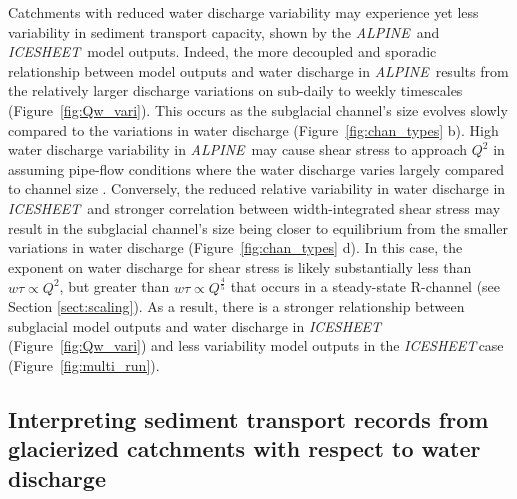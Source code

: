 \documentclass[esurf, manuscript]{copernicus}
\newcommand{\alpine}{\textit{ALPINE}\,}
\newcommand{\icesheet}{\textit{ICESHEET}\,}
\begin{document}
Catchments with reduced water discharge variability may experience yet less variability in sediment transport capacity, shown by the \alpine{} and \icesheet{} model outputs.
Indeed, the more decoupled and sporadic relationship between model outputs and water discharge in \alpine{} results from the relatively larger discharge variations on sub-daily to weekly timescales (Figure~\ref{fig:Qw_vari}).
This occurs as the subglacial channel's size evolves slowly compared to the variations in water discharge (Figure~\ref{fig:chan_types} b).
High water discharge variability in \alpine{} may cause shear stress to approach $Q^{2}$ in assuming pipe-flow conditions where the water discharge varies largely compared to channel size \citep[Figure~\ref{fig:chan_types}; Section \ref{sect:scaling}; c.f.][]{alley1997}.
Conversely, the reduced relative variability in water discharge in \icesheet{} and stronger correlation between width-integrated shear stress may result in the subglacial channel's size being closer to equilibrium from the smaller variations in water discharge (Figure~\ref{fig:chan_types} d).
In this case, the exponent on water discharge for shear stress is likely substantially less than $w\tau \propto Q^2$, but greater than $w \tau \propto Q^{\frac{4}{5}}$ that occurs in a steady-state R-channel (see Section \ref{sect:scaling}).
As a result, there is a stronger relationship between subglacial model outputs and water discharge in \icesheet{} (Figure~\ref{fig:Qw_vari}) and less variability model outputs in the \icesheet case (Figure~\ref{fig:multi_run}).

\subsection{Interpreting sediment transport records from glacierized catchments with respect to water discharge}
\end{document}

